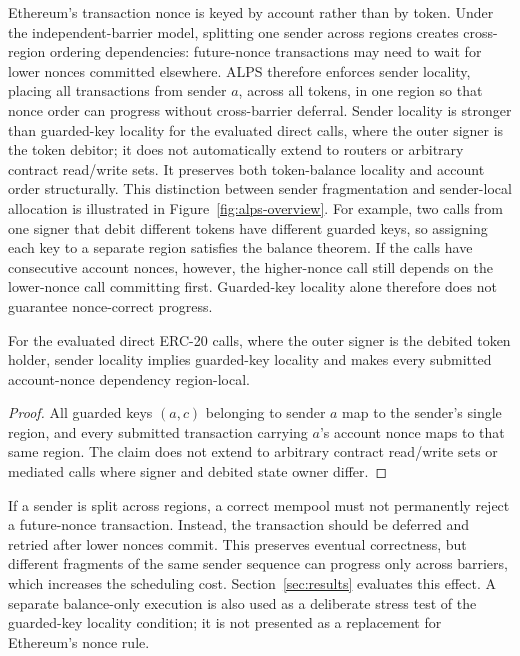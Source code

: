 \documentclass[runningheads]{llncs}
\begin{document}
Ethereum's transaction nonce is keyed by account rather than by token.
Under the independent-barrier model, splitting one sender across regions creates
cross-region ordering dependencies: future-nonce transactions may need to wait
for lower nonces committed elsewhere. ALPS therefore enforces sender locality,
placing all transactions from sender $a$, across all tokens, in one region so
that nonce order can progress without cross-barrier deferral. Sender locality is
stronger than guarded-key locality for the evaluated direct calls, where the
outer signer is the token debitor; it does not automatically extend to routers
or arbitrary contract read/write sets. It preserves both token-balance locality
and account order structurally. This distinction between sender fragmentation and
sender-local allocation is illustrated in Figure~\ref{fig:alps-overview}.
For example, two calls from one signer that debit different tokens have
different guarded keys, so assigning each key to a separate region satisfies
the balance theorem. If the calls have consecutive account nonces, however,
the higher-nonce call still depends on the lower-nonce call committing first.
Guarded-key locality alone therefore does not guarantee nonce-correct
progress.

\begin{corollary}
\label{cor:sender_locality}
For the evaluated direct ERC-20 calls, where the outer signer is the debited
token holder, sender locality implies guarded-key locality and makes every
submitted account-nonce dependency region-local.
\end{corollary}
\begin{proof}
All guarded keys $(a,c)$ belonging to sender $a$ map to the sender's single
region, and every submitted transaction carrying $a$'s account nonce maps to
that same region. The claim does not extend to arbitrary contract read/write
sets or mediated calls where signer and debited state owner differ.
\end{proof}

If a sender is split across regions, a correct mempool must not permanently
reject a future-nonce transaction. Instead, the transaction should be deferred
and retried after lower nonces commit. This preserves eventual correctness,
but different fragments of the same sender sequence can progress only across
barriers, which increases the scheduling cost. Section~\ref{sec:results}
evaluates this effect. A separate balance-only execution is also used as a
deliberate stress test of the guarded-key locality condition; it is not
presented as a replacement for Ethereum's nonce rule.
\end{document}
